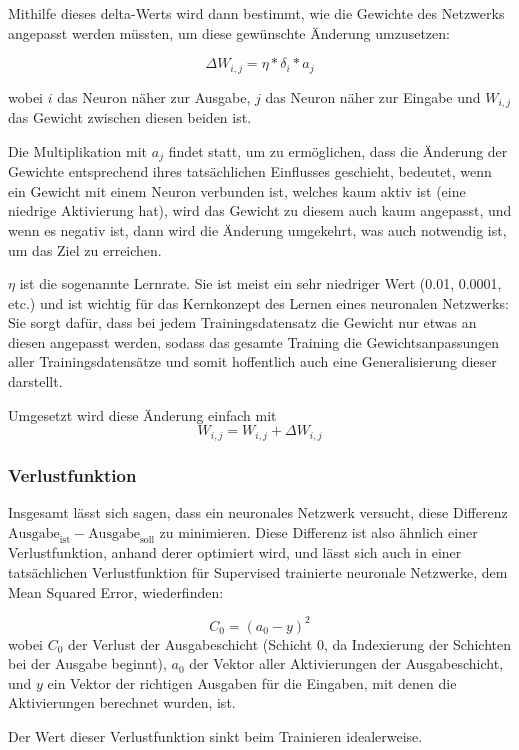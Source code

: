 \documentclass[10pt]{article}
\newcommand{\form}[1]{#1} %
\begin{document}
Mithilfe dieses delta-Werts wird dann bestimmt, wie die Gewichte des Netzwerks angepasst werden müssten, um diese gewünschte Änderung umzusetzen:

\form{\[
	\Delta W_{i,j} = \eta * \delta_i * a_j
\]}

\noindent wobei $i$ das Neuron näher zur Ausgabe, $j$ das Neuron näher zur Eingabe und $W_{i,j}$ das Gewicht zwischen diesen beiden ist.

Die Multiplikation mit $a_j$ findet statt, um zu ermöglichen, dass die Änderung der Gewichte entsprechend ihres tatsächlichen Einflusses geschieht, bedeutet, wenn ein Gewicht mit einem Neuron verbunden ist, welches kaum aktiv ist (eine niedrige Aktivierung hat), wird das Gewicht zu diesem auch kaum angepasst, und wenn es negativ ist, dann wird die Änderung umgekehrt, was auch notwendig ist, um das Ziel zu erreichen.

$\eta$ ist die sogenannte Lernrate.
Sie ist meist ein sehr niedriger Wert (0.01, 0.0001, etc.) und ist wichtig für das Kernkonzept des Lernen eines neuronalen Netzwerks:
Sie sorgt dafür, dass bei jedem Trainingsdatensatz die Gewicht nur etwas an diesen angepasst werden, sodass das gesamte Training die Gewichtsanpassungen aller Trainingsdatensätze und somit hoffentlich auch eine Generalisierung dieser darstellt.

Umgesetzt wird diese Änderung einfach mit
\form{\[
    W_{i,j} = W_{i,j} + \Delta W_{i,j}
\]}

\subsubsection{Verlustfunktion}

Insgesamt lässt sich sagen, dass ein neuronales Netzwerk versucht, diese Differenz $\textrm{Ausgabe}_\textrm{ist} - \textrm{Ausgabe}_\textrm{soll}$ zu minimieren.
Diese Differenz ist also ähnlich einer Verlustfunktion, anhand derer optimiert wird, und lässt sich auch in einer tatsächlichen Verlustfunktion für Supervised trainierte neuronale Netzwerke, dem Mean Squared Error, wiederfinden:

\form{ \[
	C_0 = (a_0 - y)^2
\]}
\noindent wobei $C_0$ der Verlust der Ausgabeschicht (Schicht $0$, da Indexierung der Schichten bei der Ausgabe beginnt), $a_0$ der Vektor aller Aktivierungen der Ausgabeschicht, und $y$ ein Vektor der richtigen Ausgaben für die Eingaben, mit denen die Aktivierungen berechnet wurden, ist.

Der Wert dieser Verlustfunktion sinkt beim Trainieren idealerweise.
\end{document}
